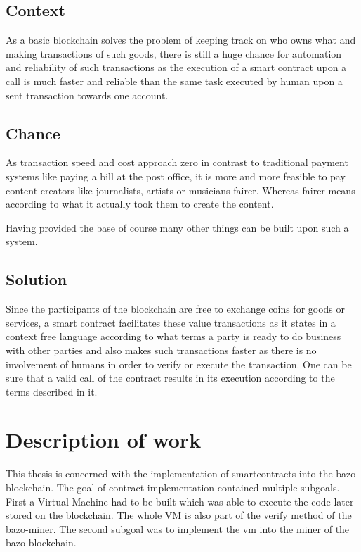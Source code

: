 \subsection{Context}
As a basic blockchain solves the problem of keeping track on who owns what and making transactions of such goods, there is still a huge chance for automation and reliability of such transactions as the execution of a smart contract upon a call is much faster and reliable than the same task executed by human upon a sent transaction towards one account.

\subsection{Chance}
As transaction speed and cost approach zero in contrast to traditional payment systems like paying a bill at the post office, it is more and more feasible to pay content creators like journalists, artists or musicians fairer. Whereas fairer means according to what it actually took them to create the content.

Having provided the base of course many other things can be built upon such a system.

\subsection{Solution}
Since the participants of the blockchain are free to exchange coins for goods or services, a smart contract facilitates these value transactions as it states in a context free language according to what terms a party is ready to do business with other parties and also makes such transactions faster as there is no involvement of humans in order to verify or execute the transaction. One can be sure that a valid call of the contract results in its execution according to the terms described in it.

\section{Description of work}
This thesis is concerned with the implementation of smartcontracts into the bazo blockchain. The goal of contract implementation contained multiple subgoals. First a Virtual Machine had to be built which was able to execute the code later stored on the blockchain. The whole VM is also part of the verify method of the bazo-miner. The second subgoal was to implement the vm into the miner of the bazo blockchain.